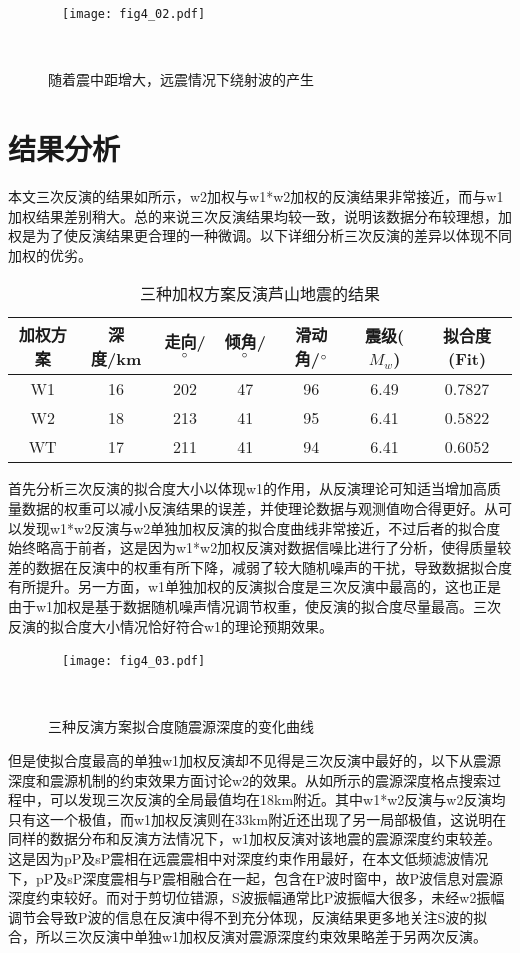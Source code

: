 \begin{figure}
\centering
  \texttt{[image: fig4\_02.pdf]}
  \caption{随着震中距增大，远震情况下绕射波的产生}
  \label{fig4_02}
\end{figure}

\section{结果分析}

本文三次反演的结果如所示，w2加权与w1*w2加权的反演结果非常接近，而与w1加权结果差别稍大。总的来说三次反演结果均较一致，说明该数据分布较理想，加权是为了使反演结果更合理的一种微调。以下详细分析三次反演的差异以体现不同加权的优劣。
\begin{table}[ht]
\centering
\caption{三种加权方案反演芦山地震的结果}
\label{tab4_01}
    \begin{tabular}{c c c c c c c}
    \hline
    加权方案 & 深度/km  & 走向/$^\circ$ & 倾角/$^\circ$ & 滑动角/$^\circ$ & 震级($M_w$) & 拟合度(Fit) \\
    \hline
    W1		& 16  & 202 & 47 & 96 & 6.49 & 0.7827 \\
    W2		& 18  & 213 & 41 & 95 & 6.41 & 0.5822 \\
    WT		& 17  & 211 & 41 & 94 & 6.41 & 0.6052 \\
    \hline
    \end{tabular}
\end{table}

首先分析三次反演的拟合度大小以体现w1的作用，从反演理论可知适当增加高质量数据的权重可以减小反演结果的误差，并使理论数据与观测值吻合得更好。从可以发现w1*w2反演与w2单独加权反演的拟合度曲线非常接近，不过后者的拟合度始终略高于前者，这是因为w1*w2加权反演对数据信噪比进行了分析，使得质量较差的数据在反演中的权重有所下降，减弱了较大随机噪声的干扰，导致数据拟合度有所提升。另一方面，w1单独加权的反演拟合度是三次反演中最高的，这也正是由于w1加权是基于数据随机噪声情况调节权重，使反演的拟合度尽量最高。三次反演的拟合度大小情况恰好符合w1的理论预期效果。
\begin{figure}
\centering
  \texttt{[image: fig4\_03.pdf]}
  \caption{三种反演方案拟合度随震源深度的变化曲线}
  \label{fig4_03}
\end{figure}

但是使拟合度最高的单独w1加权反演却不见得是三次反演中最好的，以下从震源深度和震源机制的约束效果方面讨论w2的效果。从如所示的震源深度格点搜索过程中，可以发现三次反演的全局最值均在18km附近。其中w1*w2反演与w2反演均只有这一个极值，而w1加权反演则在33km附近还出现了另一局部极值，这说明在同样的数据分布和反演方法情况下，w1加权反演对该地震的震源深度约束较差。这是因为pP及sP震相在远震震相中对深度约束作用最好，在本文低频滤波情况下，pP及sP深度震相与P震相融合在一起，包含在P波时窗中，故P波信息对震源深度约束较好。而对于剪切位错源，S波振幅通常比P波振幅大很多，未经w2振幅调节会导致P波的信息在反演中得不到充分体现，反演结果更多地关注S波的拟合，所以三次反演中单独w1加权反演对震源深度约束效果略差于另两次反演。

